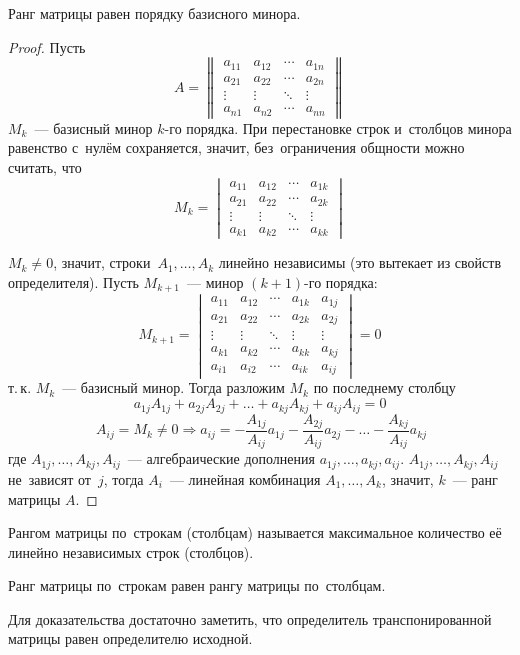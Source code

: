 \begin{theorem}
Ранг матрицы равен порядку базисного минора.
\end{theorem}
\begin{proof}
Пусть
\begin{equation*}
A =
\begin{Vmatrix}
a_{11} & a_{12} & \cdots & a_{1n} \\
a_{21} & a_{22} & \cdots & a_{2n} \\
\vdots & \vdots & \ddots & \vdots \\
a_{n1} & a_{n2} & \cdots & a_{nn}
\end{Vmatrix}
\end{equation*}
$M_k$~--- базисный минор $k$\nobreakdash-го порядка.
При перестановке строк и~столбцов минора равенство с~нулём сохраняется, значит, без~ограничения общности можно считать, что
\begin{equation*}
M_k =
\begin{vmatrix}
a_{11} & a_{12} & \cdots & a_{1k} \\
a_{21} & a_{22} & \cdots & a_{2k} \\
\vdots & \vdots & \ddots & \vdots \\
a_{k1} & a_{k2} & \cdots & a_{kk}
\end{vmatrix}
\end{equation*}

$M_k \neq 0$, значит, строки~$A_1, \ldots, A_k$ линейно независимы (это вытекает из свойств определителя). Пусть $M_{k+1}$~--- минор $(k + 1)$\nobreakdash-го порядка:
\begin{equation*}
M_{k+1} =
\begin{vmatrix}
a_{11} & a_{12} & \cdots & a_{1k} & a_{1j} \\
a_{21} & a_{22} & \cdots & a_{2k} & a_{2j} \\
\vdots & \vdots & \ddots & \vdots & \vdots \\
a_{k1} & a_{k2} & \cdots & a_{kk} & a_{kj} \\
a_{i1} & a_{i2} & \cdots & a_{ik} & a_{ij}
\end{vmatrix} = 0
\end{equation*}
т.\,к. $M_k$~--- базисный минор.
Тогда разложим $M_k$ по последнему столбцу	
$$
a_{1j} A_{1j} + a_{2j} A_{2j} + \ldots + a_{kj} A_{kj} + a_{ij} A_{ij} = 0
$$
$$
\ A_{ij} = M_k \neq 0 \Rightarrow a_{ij} = -\frac{A_{1j}}{A_{ij}} a_{1j} - \frac{A_{2j}}{A_{ij}} a_{2j} - \ldots - \frac{A_{kj}}{A_{ij}} a_{kj}
$$
где $A_{1j}, \ldots, A_{kj}, A_{ij}$~--- алгебраические дополнения $a_{1j}, \ldots, a_{kj}, a_{ij}$.
$A_{1j}, \ldots, A_{kj}, A_{ij}$ не~зависят от~$j$, тогда $A_i$~--- линейная комбинация $A_1, \ldots, A_k$, значит, $k$~--- ранг матрицы $A$.
\end{proof}

Рангом матрицы по~строкам (столбцам) называется максимальное количество её линейно независимых строк (столбцов).

\begin{consequent}
Ранг матрицы по~строкам равен рангу матрицы по~столбцам.
\end{consequent}%
Для доказательства достаточно заметить, что определитель транспонированной матрицы равен определителю исходной.